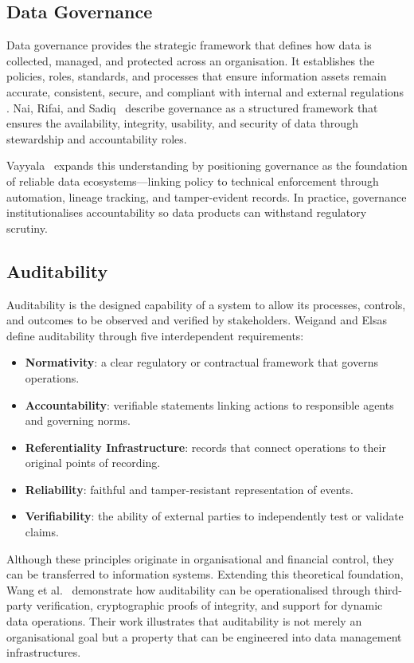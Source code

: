 \subsection*{Data Governance}
\noindent
Data governance provides the strategic framework that defines how data is
collected, managed, and protected across an organisation. It establishes the
policies, roles, standards, and processes that ensure information assets remain
accurate, consistent, secure, and compliant with internal and external
regulations \cite{elbaghazaoui_data_2025, elbaghazaoui_ensuring_2025}. Nai,
Rifai, and Sadiq~\cite{elbaghazaoui_data_2025} describe governance as a
structured framework that ensures the availability, integrity, usability, and
security of data through stewardship and accountability roles.

Vayyala~\cite{elbaghazaoui_ensuring_2025} expands this understanding by
positioning governance as the foundation of reliable data ecosystems—linking
policy to technical enforcement through automation, lineage tracking, and
tamper-evident records. In practice, governance institutionalises accountability
so data products can withstand regulatory scrutiny.

\subsection*{Auditability}
\noindent
Auditability is the designed capability of a system to allow its processes,
controls, and outcomes to be observed and verified by stakeholders. Weigand and
Elsas~\cite{weigand_auditability_2019} define auditability through five
interdependent requirements:
\begin{itemize}
  \item \textbf{Normativity}: a clear regulatory or contractual framework that
  governs operations.
  \item \textbf{Accountability}: verifiable statements linking actions to
  responsible agents and governing norms.
  \item \textbf{Referentiality Infrastructure}: records that connect operations
  to their original points of recording.
  \item \textbf{Reliability}: faithful and tamper-resistant representation of
  events.
  \item \textbf{Verifiability}: the ability of external parties to independently
  test or validate claims.
\end{itemize}

Although these principles originate in organisational and financial control,
they can be transferred to information systems. Extending this theoretical
foundation, Wang et al.~\cite{wang_enabling_2011} demonstrate how auditability
can be operationalised through third-party verification, cryptographic proofs of
integrity, and support for dynamic data operations. Their work illustrates that
auditability is not merely an organisational goal but a property that can be
engineered into data management infrastructures.

